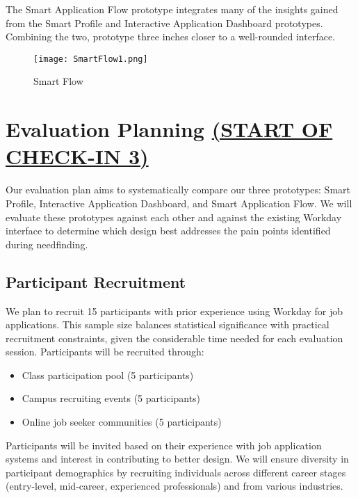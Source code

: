 \documentclass[
	letterpaper, %
]{jdf}
\begin{document}
\begin{sloppypar}
The Smart Application Flow prototype integrates many of the insights gained from the Smart Profile and Interactive Application Dashboard prototypes. Combining the two, prototype three inches closer to a well-rounded interface. 

\begin{figure}
    \centering
    \texttt{[image: SmartFlow1.png]}
    \caption{Smart Flow}
    \label{fig:enter-label}
\end{figure}




















\newpage


\section{Evaluation Planning \underline{(START OF CHECK-IN 3)}}
Our evaluation plan aims to systematically compare our three prototypes: Smart Profile, Interactive Application Dashboard, and Smart Application Flow. We will evaluate these prototypes against each other and against the existing Workday interface to determine which design best addresses the pain points identified during needfinding.

\subsection{Participant Recruitment}

We plan to recruit 15 participants with prior experience using Workday for job applications. This sample size balances statistical significance with practical recruitment constraints, given the considerable time needed for each evaluation session. Participants will be recruited through:

\begin{itemize}
    \item Class participation pool (5 participants)
    \item Campus recruiting events (5 participants)
    \item Online job seeker communities (5 participants)
\end{itemize}

Participants will be invited based on their experience with job application systems and interest in contributing to better design. We will ensure diversity in participant demographics by recruiting individuals across different career stages (entry-level, mid-career, experienced professionals) and from various industries.


\end{sloppypar}
\end{document}
